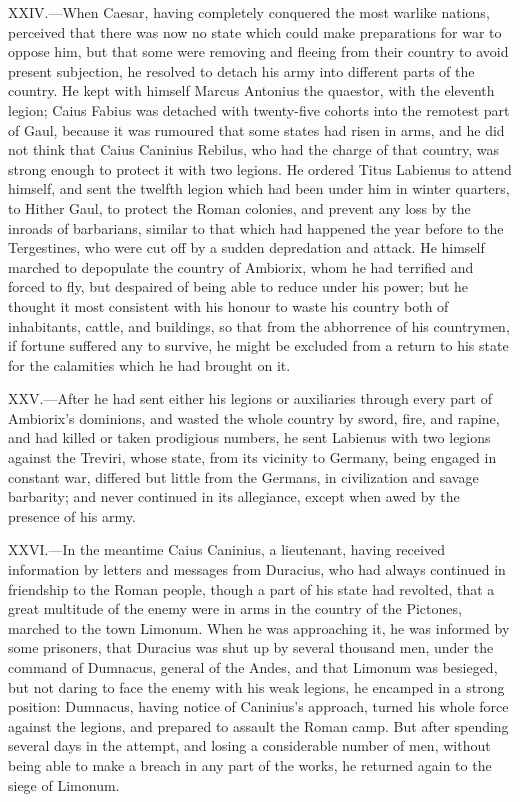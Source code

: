 XXIV.—When Caesar, having completely conquered the most warlike
nations, perceived that there was now no state which could make
preparations for war to oppose him, but that some were removing and
fleeing from their country to avoid present subjection, he resolved to
detach his army into different parts of the country. He kept with
himself Marcus Antonius the quaestor, with the eleventh legion; Caius
Fabius was detached with twenty-five cohorts into the remotest part of
Gaul, because it was rumoured that some states had risen in arms, and he
did not think that Caius Caninius Rebilus, who had the charge of that
country, was strong enough to protect it with two legions. He ordered
Titus Labienus to attend himself, and sent the twelfth legion which had
been under him in winter quarters, to Hither Gaul, to protect the Roman
colonies, and prevent any loss by the inroads of barbarians, similar to
that which had happened the year before to the Tergestines, who were cut
off by a sudden depredation and attack. He himself marched to depopulate
the country of Ambiorix, whom he had terrified and forced to fly, but
despaired of being able to reduce under his power; but he thought it
most consistent with his honour to waste his country both of
inhabitants, cattle, and buildings, so that from the abhorrence of his
countrymen, if fortune suffered any to survive, he might be excluded
from a return to his state for the calamities which he had brought on
it.

XXV.—After he had sent either his legions or auxiliaries through every
part of Ambiorix's dominions, and wasted the whole country by sword,
fire, and rapine, and had killed or taken prodigious numbers, he sent
Labienus with two legions against the Treviri, whose state, from its
vicinity to Germany, being engaged in constant war, differed but little
from the Germans, in civilization and savage barbarity; and never
continued in its allegiance, except when awed by the presence of his
army.

XXVI.—In the meantime Caius Caninius, a lieutenant, having received
information by letters and messages from Duracius, who had always
continued in friendship to the Roman people, though a part of his state
had revolted, that a great multitude of the enemy were in arms in the
country of the Pictones, marched to the town Limonum. When he was
approaching it, he was informed by some prisoners, that Duracius was
shut up by several thousand men, under the command of Dumnacus, general
of the Andes, and that Limonum was besieged, but not daring to face the
enemy with his weak legions, he encamped in a strong position: Dumnacus,
having notice of Caninius's approach, turned his whole force against the
legions, and prepared to assault the Roman camp. But after spending
several days in the attempt, and losing a considerable number of men,
without being able to make a breach in any part of the works, he
returned again to the siege of Limonum.

